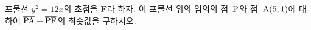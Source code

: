 포물선 $y^2=12x$의 초점을 $\mathrm{F}$라 하자. 이 포물선 위의 임의의 점~$\mathrm{P}$와 점~$\mathrm{A}(5{,}\mkern3mu\mathopen{}1)$에 대하여 $\overline{\mathrm{PA}}+\overline{\mathrm{PF}}$의 최솟값을 구하시오.
